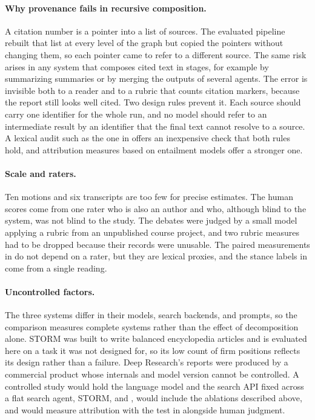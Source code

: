 \paragraph{Why provenance fails in recursive composition.}
A citation number is a pointer into a list of sources. The evaluated pipeline rebuilt that list at every level of the graph but copied the pointers without changing them, so each pointer came to refer to a different source. The same risk arises in any system that composes cited text in stages, for example by summarizing summaries or by merging the outputs of several agents. The error is invisible both to a reader and to a rubric that counts citation markers, because the report still looks well cited. Two design rules prevent it. Each source should carry one identifier for the whole run, and no model should refer to an intermediate result by an identifier that the final text cannot resolve to a source. A lexical audit such as the one in  offers an inexpensive check that both rules hold, and attribution measures based on entailment models \citep{rashkin2023ais, gao2023alce} offer a stronger one.

\paragraph{Scale and raters.}
Ten motions and six transcripts are too few for precise estimates. The human scores come from one rater who is also an author and who, although blind to the system, was not blind to the study. The debates were judged by a small model applying a rubric from an unpublished course project, and two rubric measures had to be dropped because their records were unusable. The paired measurements in  do not depend on a rater, but they are lexical proxies, and the stance labels in  come from a single reading.

\paragraph{Uncontrolled factors.}
The three systems differ in their models, search backends, and prompts, so the comparison measures complete systems rather than the effect of decomposition alone. STORM was built to write balanced encyclopedia articles and is evaluated here on a task it was not designed for, so its low count of firm positions reflects its design rather than a failure. Deep Research's reports were produced by a commercial product whose internals and model version cannot be controlled. A controlled study would hold the language model and the search API fixed across a flat search agent, STORM, and \sys{}, would include the ablations described above, and would measure attribution with the test in  alongside human judgment.

